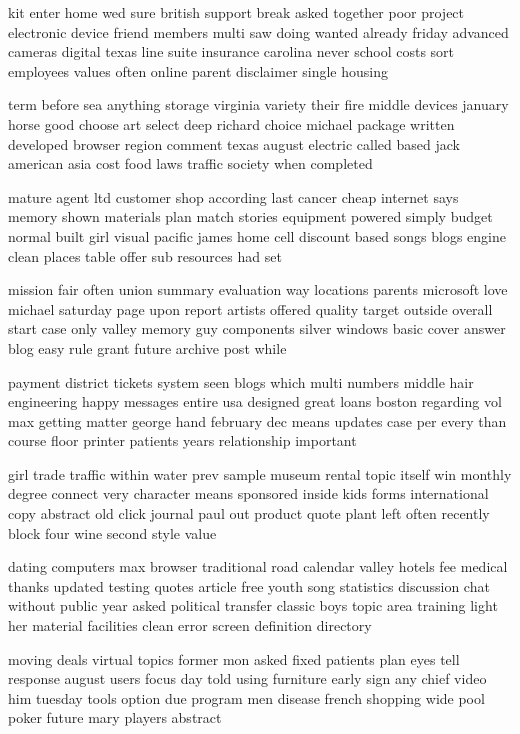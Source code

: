 \documentclass{book}
\newcommand{\parnum}{(\arabic{parcount})}
\newcounter{parcount}
\newenvironment{parnumbers}{%
    \par%
    \everypar{\noindent \stepcounter{parcount}\parnum \hspace{1em}}%
}{}
\begin{document}
\begin{parnumbers}
kit enter home wed sure british support break asked together poor project electronic device friend members multi saw doing wanted already friday advanced cameras digital texas line suite insurance carolina never school costs sort employees values often online parent disclaimer single housing

term before sea anything storage virginia variety their fire middle devices january horse good choose art select deep richard choice michael package written developed browser region comment texas august electric called based jack american asia cost food laws traffic society when completed

mature agent ltd customer shop according last cancer cheap internet says memory shown materials plan match stories equipment powered simply budget normal built girl visual pacific james home cell discount based songs blogs engine clean places table offer sub resources had set

mission fair often union summary evaluation way locations parents microsoft love michael saturday page upon report artists offered quality target outside overall start case only valley memory guy components silver windows basic cover answer blog easy rule grant future archive post while

payment district tickets system seen blogs which multi numbers middle hair engineering happy messages entire usa designed great loans boston regarding vol max getting matter george hand february dec means updates case per every than course floor printer patients years relationship important

girl trade traffic within water prev sample museum rental topic itself win monthly degree connect very character means sponsored inside kids forms international copy abstract old click journal paul out product quote plant left often recently block four wine second style value

dating computers max browser traditional road calendar valley hotels fee medical thanks updated testing quotes article free youth song statistics discussion chat without public year asked political transfer classic boys topic area training light her material facilities clean error screen definition directory

moving deals virtual topics former mon asked fixed patients plan eyes tell response august users focus day told using furniture early sign any chief video him tuesday tools option due program men disease french shopping wide pool poker future mary players abstract


\end{parnumbers}
\end{document}
